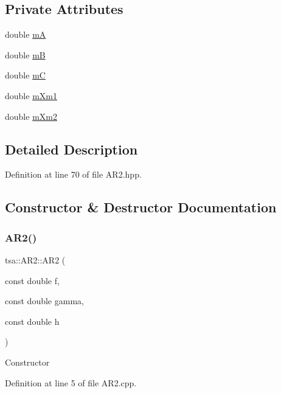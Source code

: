 \subsection*{Private Attributes}
\begin{DoxyCompactItemize}
\item 
double \hyperlink{classtsa_1_1_a_r2_ad91c696d1eb47fb92e4440de0e871b34}{mA}
\item 
double \hyperlink{classtsa_1_1_a_r2_aa5edb94b32659768807f67f124b055f7}{mB}
\item 
double \hyperlink{classtsa_1_1_a_r2_a1e28277853e0e35cca6eb9a283cbc39e}{mC}
\item 
double \hyperlink{classtsa_1_1_a_r2_a855a67e26b267c41a48b5eb48d35ec06}{m\+Xm1}
\item 
double \hyperlink{classtsa_1_1_a_r2_add01d087af153e0addabb8c5b98318e4}{m\+Xm2}
\end{DoxyCompactItemize}


\subsection{Detailed Description}


Definition at line 70 of file A\+R2.\+hpp.



\subsection{Constructor \& Destructor Documentation}
\mbox{\label{classtsa_1_1_a_r2_af98beea50a63f72e22af69e2f1843bc3}} 
\subsubsection{\texorpdfstring{A\+R2()}{AR2()}}
{\footnotesize\ttfamily tsa\+::\+A\+R2\+::\+A\+R2 (\begin{DoxyParamCaption}\item[{const double}]{f,  }\item[{const double}]{gamma,  }\item[{const double}]{h }\end{DoxyParamCaption})}

Constructor 

Definition at line 5 of file A\+R2.\+cpp.

\mbox{\label{classtsa_1_1_a_r2_a69e035a519d396ff2ef47759d6394117}} 
